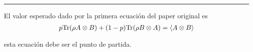 \documentclass[12pt,oneside]{book}\raggedbottom{}
\begin{document}
\theoremstyle{Tema} \newtheorem{Tema}{Tema} %
\theoremstyle{Tema} \newtheorem{serie}{Serie}              %
\theoremstyle{Tema} \newtheorem{ejercicio}{Ejercicio}    %


{
\renewcommand{\headrulewidth}{1.5pt}
\fancyhead[R]{
			}
\fancyhead[L]{ 
	}
}

{
\renewcommand{\headrulewidth}{0.8 pt}
\fancyhead[R]{
			\emph{\myName{} $-$ \myCourse{}} %
			}
\fancyhead[L]{}  
\fancyfoot[C]{}
\fancyfoot[R]{\thepage}
}

\date{}
\setlength{\headheight}{0.5in} %

\pagestyle{allStyle}

\thispagestyle{firststyle}
\begin{center}
\LARGE
\textsc{\myName}\\%
\bigskip
\hrule height 1.5pt
\end{center}


El valor esperado dado por la primera ecuación del paper original es 
\begin{equation}\label{ecuacion1paper}\begin{split}
    p{\rm Tr}(\rho A\otimes B)+(1-p){\rm Tr}(\rho B\otimes A)=    \langle A\otimes B\rangle
\end{split}\end{equation}		

esta ecuación debe ser el punto de partida.
\end{document}
